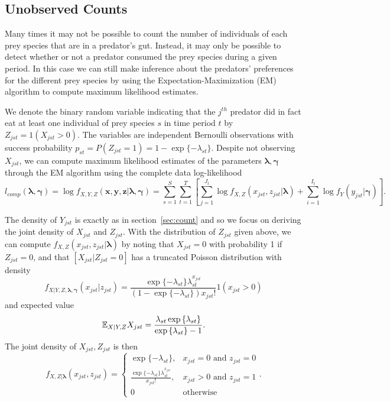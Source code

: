 \subsection{Unobserved Counts}
\label{sec:noncount}

Many times it may not be possible to count the number of individuals of each prey species that are in a predator's gut.  Instead, it may only be possible to detect whether or not a predator consumed the prey species during a given period.  In this case we can still make inference about the predators' preferences for the different prey species by using the Expectation-Maximization (EM) algorithm to compute maximum likelihood estimates. 

We denote the binary random variable indicating that the $j^{th}$ predator did in fact eat at least one individual of prey species $s$ in time period $t$ by $Z_{jst} = 1(X_{jst} > 0)$.  The variables are independent Bernoulli observations with success probability $p_{st} = P(Z_{jst}=1)= 1-\exp\{-\lambda_{st}\}$.  Despite not observing $X_{jst}$, we can compute maximum likelihood estimates of the parameters $\boldsymbol{\lambda}, \boldsymbol{\gamma}$ through the EM algorithm using the complete data log-likelihood
\[
l_{comp}(\boldsymbol{\lambda}, \boldsymbol{\gamma}) = \log f_{X,Y,Z}(\boldsymbol x, \boldsymbol y, \boldsymbol z|\boldsymbol{\lambda}, \boldsymbol{\gamma}) = \sum_{s=1}^{S} \sum_{t=1}^T \left[ \sum_{j=1}^{J_t} \log f_{X,Z}(x_{jst},z_{jst}|\boldsymbol{\lambda}) + \sum_{i=1}^{I_t}\log f_Y(y_{jst}|\boldsymbol{\gamma}) \right].
\]

The density of $Y_{jst}$ is exactly as in section~\ref{sec:count} and so we focus on deriving the joint density of $X_{jst}$ and $Z_{jst}$.  With the distribution of $Z_{jst}$ given above, we can compute $f_{X,Z}(x_{jst},z_{jst}|\boldsymbol{\lambda})$ by noting that $X_{jst}=0$ with probability 1 if $Z_{jst}=0$, and that $[X_{jst}|Z_{jst}=0]$ has a truncated Poisson distribution with density
\[
  f_{X|Y,Z,\boldsymbol{\lambda},\boldsymbol{\gamma}}(x_{jst}|z_{jst}) =
  \frac{\exp{\{-\lambda_{st}\}} \lambda_{st}^{x_{jst}}}{(1 - \exp{\{-\lambda_{st}\}}) x_{jst}!}1(x_{jst} > 0)
\]
and expected value
\[
\mathbb{E}_{X|Y,Z}X_{jst} = \frac{\lambda_{st} \exp{\{\lambda_{st} \}}}{\exp{\{ \lambda_{st} \}} - 1}.
\]
\noindent The joint density of $X_{jst}, Z_{jst}$ is then 
\begin{equation*}
    f_{X,Z|\boldsymbol{\lambda}}(x_{jst},z_{jst}) = \left\{
    \begin{array}{lr}
      \exp{\{ -\lambda_{st} \}}, & x_{jst}=0 \mbox{ and } z_{jst} = 0 \\
      \frac{\exp{\{-\lambda_{st} \}} \lambda_{st}^{x_{jst}}}{x_{jst}!}, & x_{jst} > 0 \mbox{ and } z_{jst} = 1 \\
      0 & \mbox{otherwise}
    \end{array}
  \right..
\end{equation*}

